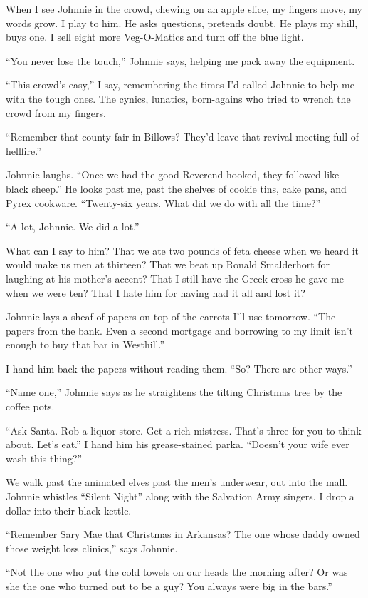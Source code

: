 \documentclass[
]{article}
\begin{document}
When I see Johnnie in the crowd, chewing on an apple slice, my fingers
move, my words grow. I play to him. He asks questions, pretends doubt.
He plays my shill, buys one. I sell eight more Veg-O-Matics and turn off
the blue light.

``You never lose the touch,'' Johnnie says, helping me pack away the
equipment.

``This crowd's easy,'' I say, remembering the times I'd called Johnnie
to help me with the tough ones. The cynics, lunatics, born-agains who
tried to wrench the crowd from my fingers.

``Remember that county fair in Billows? They'd leave that revival
meeting full of hellfire.''

Johnnie laughs. ``Once we had the good Reverend hooked, they followed
like black sheep.'' He looks past me, past the shelves of cookie tins,
cake pans, and Pyrex cookware. ``Twenty-six years. What did we do with
all the time?''

``A lot, Johnnie. We did a lot.''

What can I say to him? That we ate two pounds of feta cheese when we
heard it would make us men at thirteen? That we beat up Ronald
Smalderhort for laughing at his mother's accent? That I still have the
Greek cross he gave me when we were ten? That I hate him for having had
it all and lost it?

Johnnie lays a sheaf of papers on top of the carrots I'll use tomorrow.
``The papers from the bank. Even a second mortgage and borrowing to my
limit isn't enough to buy that bar in Westhill.''

I hand him back the papers without reading them. ``So? There are other
ways.''

``Name one,'' Johnnie says as he straightens the tilting Christmas tree
by the coffee pots.

``Ask Santa. Rob a liquor store. Get a rich mistress. That's three for
you to think about. Let's eat.'' I hand him his grease-stained parka.
``Doesn't your wife ever wash this thing?''

We walk past the animated elves past the men's underwear, out into the
mall. Johnnie whistles ``Silent Night'' along with the Salvation Army
singers. I drop a dollar into their black kettle.

``Remember Sary Mae that Christmas in Arkansas? The one whose daddy
owned those weight loss clinics,'' says Johnnie.

``Not the one who put the cold towels on our heads the morning after? Or
was she the one who turned out to be a guy? You always were big in the
bars.''
\end{document}
